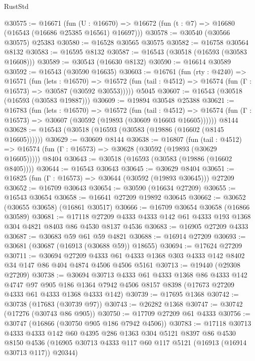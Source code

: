 \begin{lexlean}{RustStd}
\begin{coremodule}
@30575 := @16671
    (fun (U : @16670) => @16672 (fun (t : @7) => @16680 (@16543 (@16686 @25385 @16561) @16697)))
@30578 := @30540 (@30566 @30575) @25383
@30580 := @16528 @30565 @30575
@30582 := @16758 @30564 @8132
@30583 := @16595 @8132
@30587 := @16543 (@30518 (@16593 (@30583 @16608)))
@30589 := @30543 (@16630 @8132)
@30590 := @16614 @30589
@30592 := @16543 (@30590 @16635)
@30603 := @16761
    (fun (rty : @4240) =>
    @16571
      (fun (lets : @16570) =>
      @16572 (fun (tail : @4512) => @16574 (fun (Γ : @16573) => @30587 (@30592 @30553)))))
    @5045
@30607 := @16543 (@30518 (@16593 (@30583 @19887)))
@30609 := @19894 @30548 @25388
@30621 := @16783
    (fun (lets : @16570) =>
    @16572
      (fun (tail : @4512) =>
      @16574 (fun (Γ : @16573) => @30607 (@30592 (@19893 (@30609 @16603 @16605))))))
    @8144
@30628 := @16543 (@30518 (@16593 (@30583 (@19886 (@16602 (@8145 @16605))))))
@30629 := @30609 @8144
@30638 := @16807
    (fun (tail : @4512) => @16574 (fun (Γ : @16573) => @30628 (@30592 (@19893 (@30629 @16605)))))
    @8404
@30643 := @30518 (@16593 (@30583 (@19886 (@16602 @8405))))
@30644 := @16543 @30643
@30645 := @30629 @8404
@30651 := @16825 (fun (Γ : @16573) => @30644 (@30592 (@19893 @30645))) @27209
@30652 := @16709 @30643
@30654 := @30590 (@16634 @27209)
@30655 := @16543 @30654
@30658 := @16641 @27209 @19892 @30645
@30662 := @30652 (@30655 @30658) (@16861 @30517)
@30666 := @16709 @30654 @30658 (@16866 @30589)
@30681 := @17118 @27209 @4333 @4333 @142 @61 @4333 @193 @1368 @304 @4821 @8403 @86 @4530 @8137 @4536
@30683 := @16905 @27209 @4333
@30687 := @30683 @59 @61 @59 @4821
@30688 := @16914 @27209
@30693 := @30681 (@30687 (@16913 (@30688 @59)) @18655)
@30694 := @17624 @27209
@30711 := @30694
    @27209
    @4333
    @61
    @4333
    @1368
    @303
    @4333
    @142
    @8402
    @34
    @147
    @86
    @404
    @4874
    @4506
    @4506
    @5161
@30713 := @19440 (@29308 @27209)
@30738 := @30694
    @30713
    @4333
    @61
    @4333
    @1368
    @86
    @4333
    @142
    @4747
    @97
    @905
    @186
    @1364
    @7942
    @4506
    @8157
    @8398
    (@17673 @27209 @4333 @61 @4333 @1368 @4333 @142)
@30739 := @17695 @1368
@30742 := @30738 (@17683 (@30739 @97))
@30743 := @26282 @1368
@30747 := @30742 (@17276 (@30743 @86 @905))
@30750 := @17709 @27209 @61 @4333
@30756 := @30747 (@16866 (@30750 @905 @186 @7942 @4506))
@30783 := @17118
    @30713
    @4333
    @4333
    @142
    @60
    @4395
    @286
    @1363
    @304
    @5121
    @8397
    @86
    @4530
    @8150
    @4536
    (@16905 @30713 @4333 @117 @60 @117 @5121 (@16913 (@16914 @30713 @117)) @20344)

\end{coremodule}
\end{lexlean}
